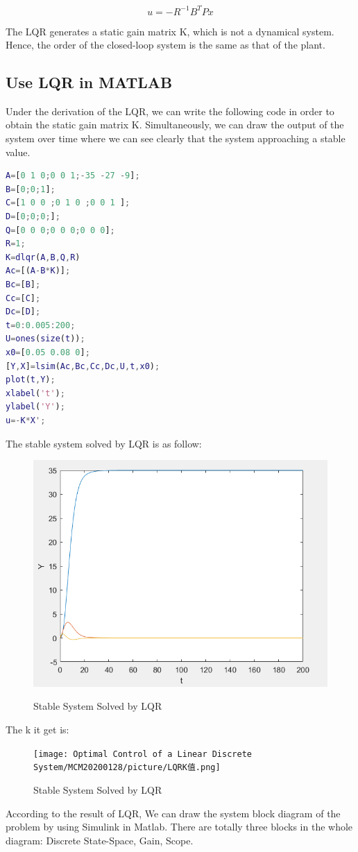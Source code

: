 \documentclass{mcmthesis}
\begin{document}
$$u = −R^{−1}B^{T}Px$$

The LQR generates a static gain matrix K, which is not a dynamical system.\cite{conf/rait/BhushanCS16}
Hence, the order of the closed-loop system is the same as that of the plant.
\subsection{Use LQR in MATLAB}
Under the derivation of the LQR, we can write the following code in order to obtain the static gain matrix K. Simultaneously, we can draw the output of the system over time where we can see clearly that the system approaching a stable value.

\begin{lstlisting}[language=MATLAB, caption=LQR in MATLAB]
A=[0 1 0;0 0 1;-35 -27 -9];
B=[0;0;1];
C=[1 0 0 ;0 1 0 ;0 0 1 ];
D=[0;0;0;];
Q=[0 0 0;0 0 0;0 0 0];
R=1;
K=dlqr(A,B,Q,R)
Ac=[(A-B*K)];
Bc=[B];
Cc=[C];
Dc=[D];
t=0:0.005:200;
U=ones(size(t));
x0=[0.05 0.08 0];
[Y,X]=lsim(Ac,Bc,Cc,Dc,U,t,x0);
plot(t,Y);
xlabel('t');
ylabel('Y');
u=-K*X';
\end{lstlisting}

The stable system solved by LQR is as follow:

\begin{figure}[H]%
  \centering
  \caption{Stable System Solved by LQR}
  \includegraphics[width=50ex]{Optimal Control of a Linear Discrete System/MCM20200128/picture/LQR结果.png} %
  \label{Fig.RNN} %
\end{figure}
The k it get is:
\begin{figure}[H]%
  \centering
  \caption{Stable System Solved by LQR}
  \texttt{[image: Optimal Control of a Linear Discrete System/MCM20200128/picture/LQRK值.png]} %
  \label{Fig.RNN} %
\end{figure}
According to the result of LQR, We can draw the system block diagram of the problem by using Simulink in Matlab. There are totally three blocks in the whole diagram: Discrete State-Space, Gain, Scope.
\end{document}
